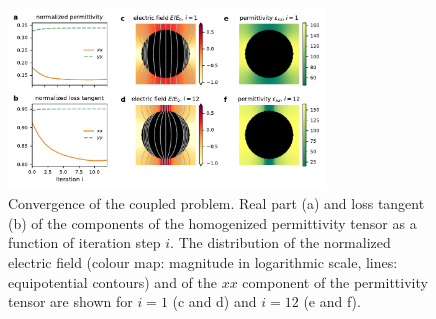 \documentclass[%
 aip,
 amsmath,amssymb,
 reprint,%
linenumbers
]{revtex4-1}
\begin{document}
\begin{figure}[!t]
 \centering
 \includegraphics[width=0.75\textwidth]{convergence_per}
 \caption{Convergence of the coupled problem.
  Real part (a) and loss tangent (b) of the components of the homogenized
  permittivity tensor as a function of iteration step $i$. The distribution of
  the normalized electric field (colour map: magnitude in logarithmic scale,
  lines: equipotential contours) and of the
  $xx$ component of the permittivity tensor are shown for $i=1$
  (c and d) and $i=12$ (e and f).
 }
 \label{conv2D}
\end{figure}

\end{document}

